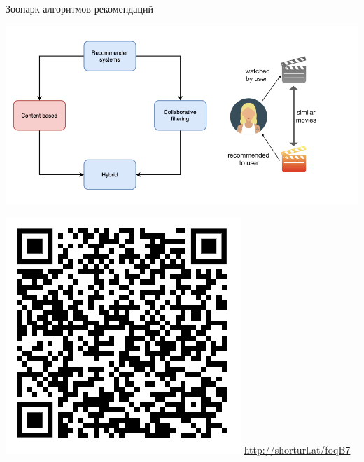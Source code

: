 \documentclass[11pt,aspectratio=169,handout]{beamer}
\begin{document}
\begin{frame}{Зоопарк алгоритмов рекомендаций \cite{ali_2021}}

\begin{center}
\includegraphics[scale=0.27]{images/taxonomy-2.png}
\end{center}

\includegraphics[scale=0.3]{images/poll.png} \hfill \url{http://shorturl.at/foqB7}

\end{frame}
\end{document}
